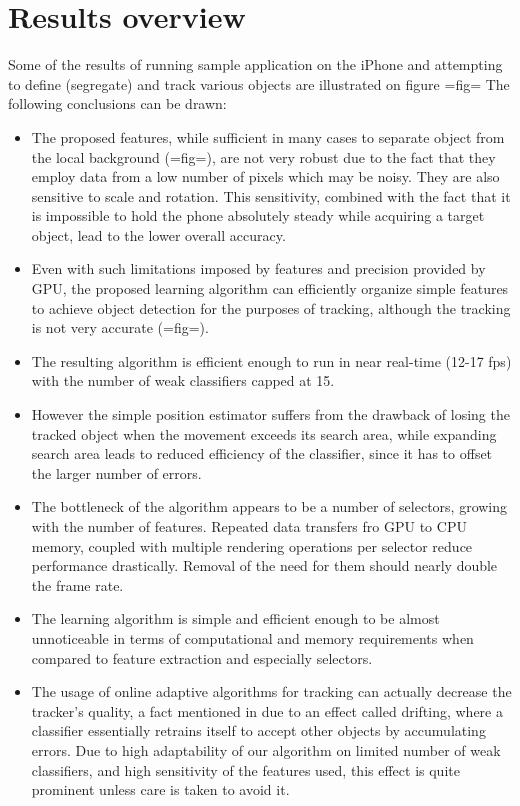 \section{Results overview}
Some of the results of running sample application on the iPhone and attempting to define (segregate) and track various objects are illustrated on figure {{=fig=}}
The following conclusions can be drawn:
\begin{itemize}
\item The proposed features, while sufficient in many cases to separate object from the local background ({{=fig=}}), are not very robust due to the fact that they employ data from a low  number of pixels which may be noisy. They are also sensitive to scale and rotation. This sensitivity, combined with the fact that it is impossible to hold the phone absolutely steady while acquiring a target object, lead to the lower overall accuracy. 
\item Even with such limitations imposed by features and precision provided by GPU, the proposed learning algorithm can efficiently organize simple features to achieve object detection for the purposes of tracking, although the tracking is not very accurate ({{=fig=}}).  
\item The resulting algorithm is efficient enough to run in near real-time (12-17 fps) with the number of weak classifiers capped at 15.
\item However the simple position estimator suffers from the drawback of losing the tracked object when the movement exceeds its search area, while expanding search area leads to reduced efficiency of the classifier, since it has to offset the larger number of errors. 
\item The bottleneck of the algorithm appears to be a number of selectors, growing with the number of features. Repeated data transfers fro GPU to CPU memory, coupled with multiple rendering operations per selector reduce performance drastically. Removal of the need for them should nearly double the frame rate.
\item The learning algorithm is simple and efficient enough to be almost unnoticeable in terms of computational and memory requirements when compared to feature extraction and especially selectors.
\item The usage of online adaptive algorithms for tracking can actually decrease the tracker's quality, a fact mentioned in \cite{grabner2008} due to an effect called drifting, where a classifier essentially retrains itself to accept other objects by accumulating errors. Due to high adaptability of our algorithm on limited number of weak classifiers, and high sensitivity of the features used, this effect is quite prominent unless care is taken to avoid it. 
\end{itemize}

